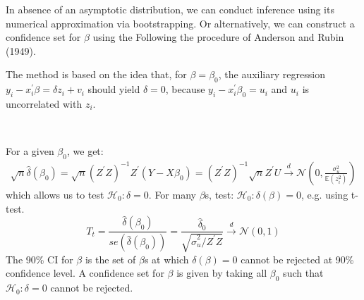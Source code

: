 In absence of an asymptotic distribution, we can conduct inference using its numerical approximation via bootstrapping.
Or alternatively, we can construct a confidence set for $\beta$ using the Following the procedure of Anderson and Rubin (1949).

The method is based on the idea that, for $\beta = \beta_0$, the auxiliary regression $y_i - x_i^{\prime} \beta = \delta z_i + v_i$ should yield $\delta =0$,
because $y_i - x_i^{\prime} \beta_0 = u_i$ and $u_i$ is uncorrelated with $z_i$.

\begin{theorem}\label{thm:IV-AR}
    \
    
    For a given $\beta_0$, we get:
    \begin{gather*}
        \sqrt{n} \hat{\delta}(\beta_0) = \sqrt{n} \left(Z^{\prime} Z \right)^{-1} Z^{\prime} (Y - X \beta_0) = \left(Z^{\prime} Z\right)^{-1} \sqrt{n} Z^{\prime} U \overset{d}{\rightarrow} \mathcal{N} \left(0, \frac{\sigma_u^2}{\mathbb{E}(z_i^2)} \right)
    \end{gather*}
    which allows us to test $\mathcal{H}_0: \delta =0.$
    For many $\beta$s, test: $\mathcal{H}_0: \delta(\beta) = 0$, e.g. using t-test.
    \[T_t = \frac{\hat{\delta}(\beta_0)}{se(\hat{\delta}(\beta_0))} = \frac{\hat{\delta}_0}{\sqrt{\hat{\sigma}_u^2 / Z^{\prime} Z} } \overset{d}{\rightarrow} \mathcal{N}(0,1)\]
    The 90\% CI for $\beta$ is the set of $\beta$s at which $\delta(\beta) = 0$ cannot be rejected at 90\% confidence level.
    A confidence set for $\beta$ is given by taking all $\beta_0$ such that $\mathcal{H}_0: \delta =0$ cannot be rejected.
\end{theorem}

